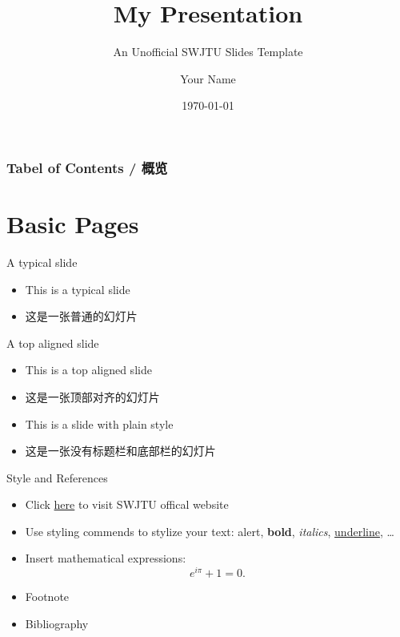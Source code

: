 \documentclass{beamer}
\title{My Presentation}
\subtitle{An Unofficial SWJTU Slides Template}
\author{Your Name}
\institute{Southwest Jiaotong University}
\date{\today}
\begin{document}
\begin{frame}[plain]
    \titlepage
\end{frame}


{
\begin{frame}
    \frametitle{Tabel of Contents / 概览}
    \tableofcontents
\end{frame}
}


\section{Basic Pages}

\begin{frame}{A typical slide}
    \begin{itemize}
        \item This is a typical slide
        \item 这是一张普通的幻灯片
    \end{itemize}
\end{frame}

\begin{frame}[t]{A top aligned slide}
    \vspace{20pt}
    \begin{itemize}
        \item This is a top aligned slide
        \item 这是一张顶部对齐的幻灯片
    \end{itemize}
\end{frame}

\begin{frame}[plain]
    \begin{itemize}
        \item This is a slide with plain style
        \item 这是一张没有标题栏和底部栏的幻灯片
    \end{itemize}
\end{frame}

\begin{frame}{Style and References}
    \begin{itemize}
        \item Click \textcolor{href}{\href{https://www.swjtu.edu.cn/}{here}} to visit SWJTU offical website
        \item Use styling commends to stylize your text: \alert{alert}, \textbf{bold}, \textit{italics}, \underline{underline}, \dots
        \item Insert mathematical expressions:
        \begin{equation*}
            e^{i\pi} + 1 = 0.
        \end{equation*}
        \item Footnote\footnotemark
        \item Bibliography \cite{knuth}
    \end{itemize}
\end{frame}
\end{document}
